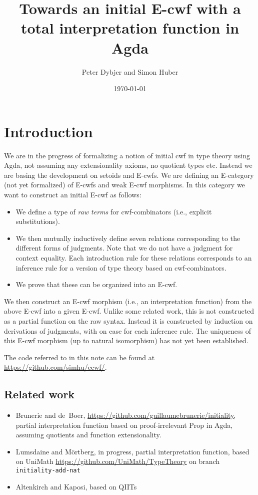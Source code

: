 \documentclass{amsart}
\title{Towards an initial E-cwf with a total interpretation function
  in Agda}
\date{\today}
\author{Peter Dybjer and Simon Huber}
\theoremstyle{plain}
\theoremstyle{definition}
\theoremstyle{remark}
\begin{document}
\maketitle

\section{Introduction}
\label{sec:introduction}

We are in the progress of formalizing a notion of initial cwf in type
theory using Agda, not assuming any extensionality axioms, no quotient
types etc.  Instead we are basing the development on setoids and
E-cwfs.  We are defining an E-category (not yet formalized) of E-cwfs
and weak E-cwf morphisms.  In this category we want to construct an
initial E-cwf as follows:
\begin{itemize}
\item We define a type of \emph{raw terms} for cwf-combinators (i.e.,
  explicit substitutions).
\item We then mutually inductively define seven relations
  corresponding to the different forms of judgments.  Note that we do
  not have a judgment for context equality.  Each introduction rule
  for these relations corresponds to an inference rule for a version
  of type theory based on cwf-combinators.
\item We prove that these can be organized into an E-cwf.
\end{itemize}
We then construct an E-cwf morphism (i.e., an interpretation function)
from the above E-cwf into a given E-cwf.  Unlike some related work,
this is not constructed as a partial function on the raw syntax.
Instead it is constructed by induction on derivations of judgments,
with on case for each inference rule.  The uniqueness of this E-cwf
morphism (up to natural isomorphism) has not yet been established.

The code referred to in this note can be found at
\url{https://github.com/simhu/ecwf/}.

\subsection{Related work}
\label{sec:related-work}

\begin{itemize}
\item Brunerie and de~Boer,
  \url{https://github.com/guillaumebrunerie/initiality}, partial
  interpretation function based on proof-irrelevant Prop in Agda,
  assuming quotients and function extensionality.
\item Lumsdaine and Mörtberg, in progress, partial interpretation
  function, based on UniMath
  \url{https://github.com/UniMath/TypeTheory} on branch
  \texttt{initiality-add-nat}
\item Altenkirch and Kaposi, based on QIITs
\end{itemize}
\end{document}
